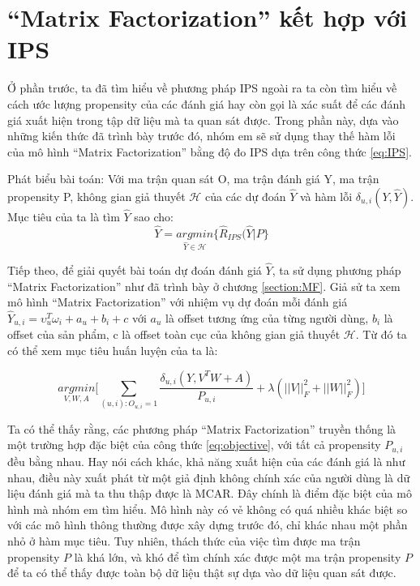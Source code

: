 \section{``Matrix Factorization'' kết hợp với IPS}
\label{sec:3_MFIPS}
Ở phần trước, ta đã tìm hiểu về phương pháp IPS ngoài ra ta còn tìm hiểu về cách ước lượng propensity của các đánh giá hay còn gọi là xác suất để các đánh giá xuất hiện trong tập dữ liệu mà ta quan sát được. Trong phần này, dựa vào những kiến thức đã trình bày trước đó, nhóm em sẽ sử dụng thay thế hàm lỗi của mô hình ``Matrix Factorization'' bằng độ đo IPS dựa trên công thức \ref{eq:IPS}. 

Phát biểu bài toán: Với ma trận quan sát O, ma trận đánh giá Y, ma trận propensity P, không gian giả thuyết $\mathcal{H}$ của các dự đoán $\hat{Y}$ và hàm lỗi $\delta_{u,i}(Y, \hat{Y})$. Mục tiêu của ta là tìm $\hat{Y}$ sao cho:
\begin{equation}
    \label{eq:ERM}
    \hat{Y} = \underset{\hat{Y} \in \mathcal{H}}{argmin}\bigg\{\hat{R}_{IPS}(\hat{Y}|P\bigg\}
\end{equation}

Tiếp theo, để giải quyết bài toán dự đoán đánh giá $\hat{Y}$, ta sử dụng phương pháp ``Matrix Factorization'' như đã trình bày ở chương \ref{section:MF}. Giả sử ta xem mô hình ``Matrix Factorization'' với nhiệm vụ dự đoán mỗi đánh giá $\hat{Y}_{u,i} = \upsilon_u^T \omega_i + a_u + b_i + c$ với $a_u$ là  offset tương ứng của từng người dùng, $b_i$ là offset của sản phẩm, c là offset toàn cục của không gian giả thuyết $\mathcal{H}$. Từ đó ta có thể xem mục tiêu huấn luyện của ta là:

\begin{equation}
    \label{eq:objective}
    \underset{V,W,A}{argmin} \bigg[ \sum_{(u,i):O_{u,i}=1} \frac{\delta_{u,i}(Y,V^TW + A)}{P_{u,i}} + \lambda(||V||_{F}^2 + ||W||_{F}^2) \Bigg]
\end{equation}

Ta có thể thấy rằng, các phương pháp ``Matrix Factorization'' truyền thống là một trường hợp đặc biệt của công thức \ref{eq:objective}, với tất cả propensity $P_{u,i}$ đều bằng nhau. Hay nói cách khác, khả năng xuất hiện của các đánh giá là như nhau, điều này xuất phát từ một giả định không chính xác của người dùng là dữ liệu đánh giá mà ta thu thập được là MCAR. Đây chính là điểm đặc biệt của mô hình mà nhóm em tìm hiểu. Mô hình này có vẻ không có quá nhiều khác biệt so với các mô hình thông thường được xây dựng trước đó, chỉ khác nhau một phần nhỏ ở hàm mục tiêu. Tuy nhiên, thách thức của việc tìm được ma trận propensity $P$ là khá lớn, và khó để tìm chính xác được một ma trận propensity $P$ để ta có thể thấy được toàn bộ dữ liệu thật sự dựa vào dữ liệu quan sát được. 

